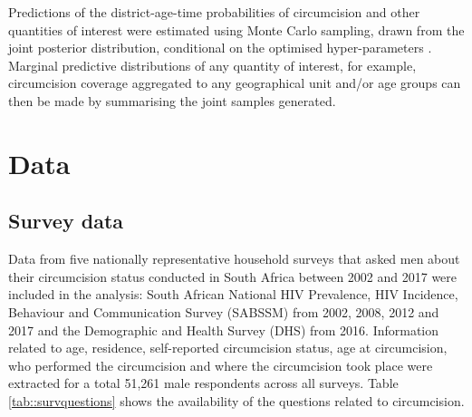 \documentclass{article}
\begin{document}
\begin{appendix}
\noindent Predictions of the district-age-time probabilities of circumcision and other quantities of interest were estimated using Monte Carlo sampling, drawn from the joint posterior distribution, conditional on the optimised hyper-parameters \cite{eaton2021naomi}. Marginal predictive distributions of any quantity of interest, for example, circumcision coverage aggregated to any geographical unit and/or age groups can then be made by summarising the joint samples generated.


\section{Data}


\subsection{Survey data}


\noindent Data from five nationally representative household surveys that asked men about their circumcision status conducted in South Africa between 2002 and 2017 were included in the analysis: South African National HIV Prevalence, HIV Incidence, Behaviour and Communication Survey (SABSSM) from 2002, 2008, 2012 and 2017 and the Demographic and Health Survey (DHS) from 2016. Information related to age, residence, self-reported circumcision status, age at circumcision, who performed the circumcision and where the circumcision took place were extracted for a total 51,261 male respondents across all surveys. Table \ref{tab::survquestions} shows the availability of the questions related to circumcision.\\


\end{appendix}
\end{document}
